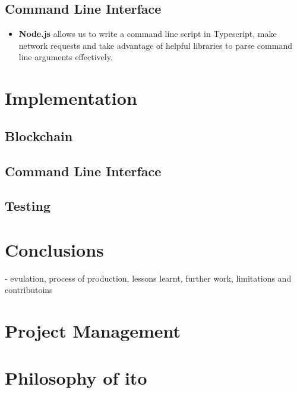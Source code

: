 \documentclass[12pt,a4paper]{article}
\begin{document}
\subsection{Command Line Interface}
\begin{itemize}
    \item \textbf{Node.js} allows us to write a command line script in Typescript, make network requests and take advantage of helpful libraries to parse command line arguments effectively.
\end{itemize}


\section{Implementation}
\subsection{Blockchain}
\subsection{Command Line Interface}
\subsection{Testing}

\section{Conclusions}
- evulation, process of production, lessons learnt, further work, limitations and contributoins

\section{Project Management}

\section{Philosophy of ito}
\newpage

\end{document}
